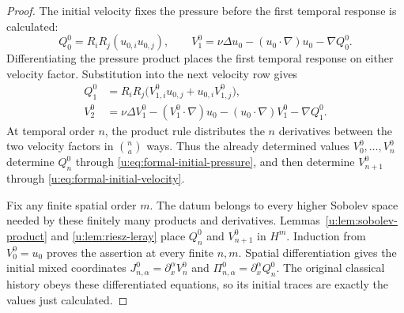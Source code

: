 \begin{proof}
The initial velocity fixes the pressure before the first temporal response is
calculated:
\[
 Q_0^0=R_iR_j(u_{0,i}u_{0,j}),
 \qquad
 V_1^0=\nu\Delta u_0-(u_0\cdot\nabla)u_0-\nabla Q_0^0.
\]
Differentiating the pressure product places the first temporal response on
either velocity factor. Substitution into the next velocity row gives
\[
 \begin{aligned}
 Q_1^0&=R_iR_j
 \bigl(V_{1,i}^0u_{0,j}+u_{0,i}V_{1,j}^0\bigr),\\
 V_2^0&=\nu\Delta V_1^0
 -(V_1^0\cdot\nabla)u_0
 -(u_0\cdot\nabla)V_1^0-\nabla Q_1^0.
 \end{aligned}
\]
At temporal order \(n\), the product rule distributes the \(n\)
derivatives between the two velocity factors in \(\binom na\) ways.
Thus the already determined values \(V_0^0,\ldots,V_n^0\) determine
\(Q_n^0\) through \eqref{u:eq:formal-initial-pressure}, and then determine
\(V_{n+1}^0\) through \eqref{u:eq:formal-initial-velocity}.

Fix any finite spatial order \(m\). The datum belongs to every higher
Sobolev space needed by these finitely many products and derivatives.
Lemmas~\ref{u:lem:sobolev-product} and \ref{u:lem:riesz-leray} place
\(Q_n^0\) and \(V_{n+1}^0\) in \(H^m\). Induction from
\(V_0^0=u_0\) proves the assertion at every finite \(n,m\).
Spatial differentiation gives the initial mixed coordinates
\(J_{n,\alpha}^0=\partial_x^\alpha V_n^0\) and
\(\Pi_{n,\alpha}^0=\partial_x^\alpha Q_n^0\).
The original classical history obeys these differentiated equations, so its
initial traces are exactly the values just calculated.
\end{proof}

